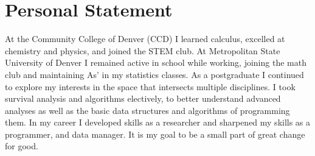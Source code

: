 
\section{Personal Statement}
      
\hspace{1cm} At the Community College of Denver (CCD) I learned calculus, excelled at chemistry and physics, and joined the STEM club.
At Metropolitan State University of Denver I remained active in school while working, joining the math club and maintaining As' in my statistics classes.
As a postgraduate I continued to explore my interests in the space that intersects multiple disciplines.
I took survival analysis and algorithms electively, to better understand advanced analyses as well as the basic data structures and algorithms of programming them.
In my career I developed skills as a researcher and sharpened my skills as a programmer, and data manager.  
It is my goal to be a small part of great change for good.
